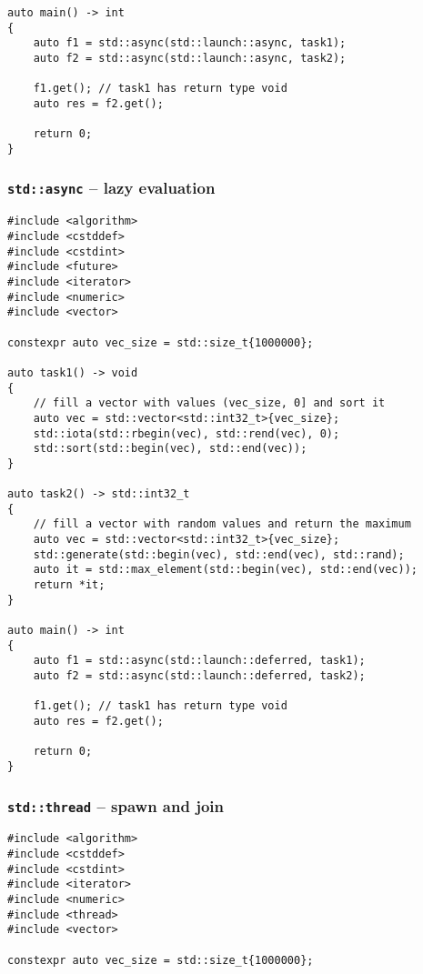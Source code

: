\begin{appendix}
\begin{lstlisting}
auto main() -> int
{
    auto f1 = std::async(std::launch::async, task1);
    auto f2 = std::async(std::launch::async, task2);
    
    f1.get(); // task1 has return type void
    auto res = f2.get();
    
    return 0;
}
\end{lstlisting}

\subsubsection{\texttt{std::async} -- lazy evaluation}\label{app:scorep_conc_async_lazy}

\begin{lstlisting}
#include <algorithm>
#include <cstddef>
#include <cstdint>
#include <future>
#include <iterator>
#include <numeric>
#include <vector>

constexpr auto vec_size = std::size_t{1000000};

auto task1() -> void
{
    // fill a vector with values (vec_size, 0] and sort it
    auto vec = std::vector<std::int32_t>{vec_size};
    std::iota(std::rbegin(vec), std::rend(vec), 0);
    std::sort(std::begin(vec), std::end(vec));
}

auto task2() -> std::int32_t
{
    // fill a vector with random values and return the maximum
    auto vec = std::vector<std::int32_t>{vec_size};
    std::generate(std::begin(vec), std::end(vec), std::rand);
    auto it = std::max_element(std::begin(vec), std::end(vec));
    return *it;
}

auto main() -> int
{
    auto f1 = std::async(std::launch::deferred, task1);
    auto f2 = std::async(std::launch::deferred, task2);
    
    f1.get(); // task1 has return type void
    auto res = f2.get();
    
    return 0;
}
\end{lstlisting}

\subsubsection{\texttt{std::thread} -- spawn and join}\label{app:conc_thread_join}

\begin{lstlisting}
#include <algorithm>
#include <cstddef>
#include <cstdint>
#include <iterator>
#include <numeric>
#include <thread>
#include <vector>

constexpr auto vec_size = std::size_t{1000000};


\end{lstlisting}
\end{appendix}
